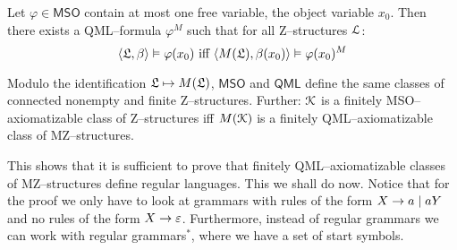 \begin{thm}
Let $\varphi \in \mathsf{MSO}$ contain at most one free 
variable, the object variable $x_0$. Then there exists a
QML--formula $\varphi^M$ such that for all Z--struc\-tu\-res
$\mathcal{L}$:
\begin{equation}
\langle \mathfrak{L}, \beta\rangle \vDash \varphi(x_0)
\mbox{ iff }\langle M(\mathfrak{L}), \beta(x_0)\rangle \vDash
\varphi(x_0)^M
\end{equation}
\end{thm}
\begin{cor}
\label{cor:mql}
Modulo the identification $\mathfrak{L} \mapsto M(\mathfrak{L})$, $\mathsf{MSO}$
and $\mathsf{QML}$ define the same classes of connected
nonempty and finite Z--structures. Further: $\mathcal{K}$ is a finitely
MSO--axiomatizable class of Z--structures iff $M(\mathcal{K})$ is a 
finitely QML--axiomatizable class of MZ--structures.
\end{cor}
This shows that it is sufficient to prove that finitely 
QML--axiomatizable classes of MZ--structures define regular 
languages. This we shall do now. Notice that for the proof we 
only have to look at grammars with rules of the form 
$X \rightarrow a \mid aY$ and no rules of the form $X \rightarrow \varepsilon$. 
Furthermore, instead of regular grammars we can work with 
regular grammars$^{\ast}$, where we have a set of start symbols. 

